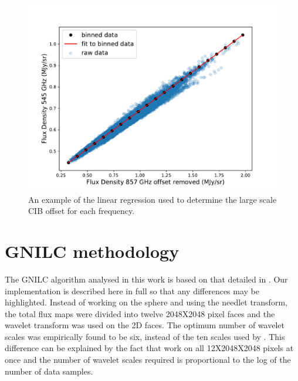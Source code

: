 \documentclass[a4paper,fleqn,usenatbib]{mnras}
\begin{document}
\begin{figure}
\centering
\includegraphics[width=0.95\linewidth]{ciboffsetEx}
\caption{An example of the linear regression used to determine the large scale CIB offset for each frequency.}
\label{fig:ciboffsetLinear}
\end{figure}

\section{GNILC methodology}\label{sec:apB}

The GNILC algorithm analysed in this work is based on that detailed in \citet{gnilc}. Our implementation is described here in full so that any differences may be highlighted. Instead of working on the sphere and using the needlet transform, the total flux maps were divided into twelve 2048X2048 pixel faces and the wavelet transform was used on the 2D faces. The optimum number of wavelet scales was empirically found to be six, instead of the ten scales used by \citet{gnilc}. This difference can be explained by the fact that \citet{gnilc} work on all 12X2048X2048 pixels at once and the number of wavelet scales required is proportional to the log of the number of data samples. 
\end{document}
